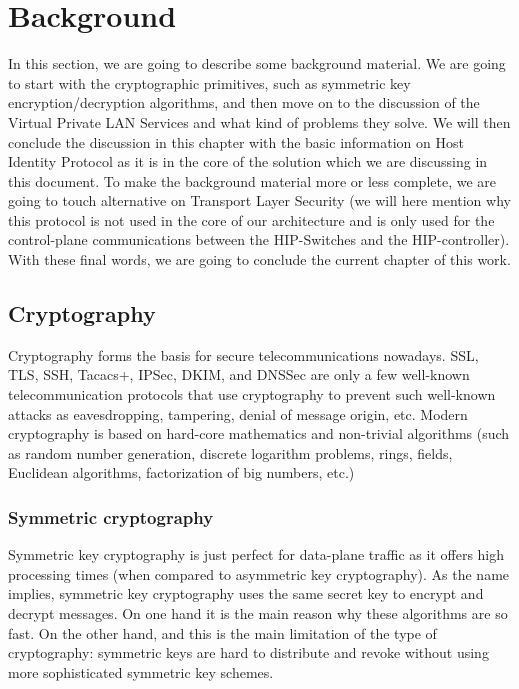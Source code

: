 \chapter{Background}

In this section, we are going to describe some background material. 
We are going to start with the cryptographic primitives, such as 
symmetric key encryption/decryption algorithms, and then move on 
to the discussion of the Virtual Private LAN Services and what kind 
of problems they solve. We will then conclude the discussion in this 
chapter with the basic information on Host Identity Protocol as it 
is in the core of the solution which we are discussing in this 
document. To make the background material more or less complete, 
we are going to touch alternative on Transport Layer Security (we 
will here mention why this protocol is not used in the core of our 
architecture and is only used for the control-plane communications 
between the HIP-Switches and the HIP-controller). With these final 
words, we are going to conclude the current chapter of this work. 

\section{Cryptography}
Cryptography forms the basis for secure telecommunications nowadays. 
SSL, TLS, SSH, Tacacs+, IPSec, DKIM, and DNSSec are only a few well-known 
telecommunication protocols that use cryptography to prevent such well-known 
attacks as eavesdropping, tampering, denial of message origin, etc. Modern 
cryptography is based on hard-core mathematics and non-trivial algorithms 
(such as random number generation, discrete logarithm problems, rings, fields, 
Euclidean algorithms, factorization of big numbers, etc.) 

\subsection{Symmetric cryptography}
Symmetric key cryptography is just perfect for data-plane traffic as it offers 
high processing times (when compared to asymmetric key cryptography). As the 
name implies, symmetric key cryptography uses the same secret key to encrypt 
and decrypt messages. On one hand it is the main reason why these algorithms 
are so fast. On the other hand, and this is the main limitation of the type 
of cryptography: symmetric keys are hard to distribute and revoke without using 
more sophisticated symmetric key schemes. 


